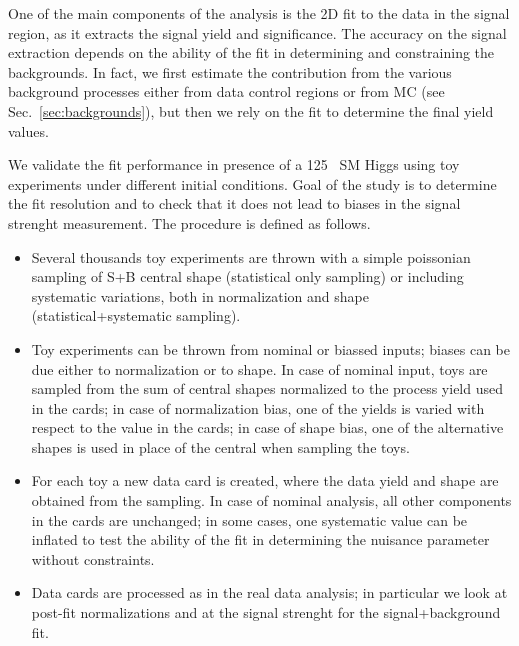 One of the main components of the analysis is the 2D fit to the data in the signal region, 
as it extracts the signal yield and significance.
The accuracy on the signal extraction depends on the ability of the fit in determining 
and constraining the backgrounds.
In fact, we first estimate the contribution from the various background processes 
either from data control regions or from MC (see Sec.~\ref{sec:backgrounds}), 
but then we rely on the fit to determine the final yield values. 

We validate the fit performance in presence of a 125 \GeV\ SM Higgs using toy experiments 
under different initial conditions.
Goal of the study is to determine the fit resolution and to check that it does not lead to 
biases in the signal strenght measurement. The procedure is defined as follows.

\begin{itemize}
\item Several thousands toy experiments are thrown with a simple poissonian sampling of S+B central shape (statistical only sampling)
or including systematic variations, both in normalization and shape (statistical+systematic sampling). 
\item Toy experiments can be thrown from nominal or biassed inputs; biases can be due either to normalization or to shape. 
In case of nominal input, toys are sampled from the sum of central shapes normalized to the process yield used in the cards;
in case of normalization bias, one of the yields is varied with respect to the value in the cards; 
in case of shape bias, one of the alternative shapes is used in place of the central when sampling the toys.
\item For each toy a new data card is created, where the data yield and shape are obtained from the sampling.
In case of nominal analysis, all other components in the cards are unchanged; 
in some cases, one systematic value can be inflated to test the ability of the fit in determining 
the nuisance parameter without constraints.
\item Data cards are processed as in the real data analysis; in particular we look at post-fit normalizations 
and at the signal strenght for the signal+background fit.
\end{itemize}

